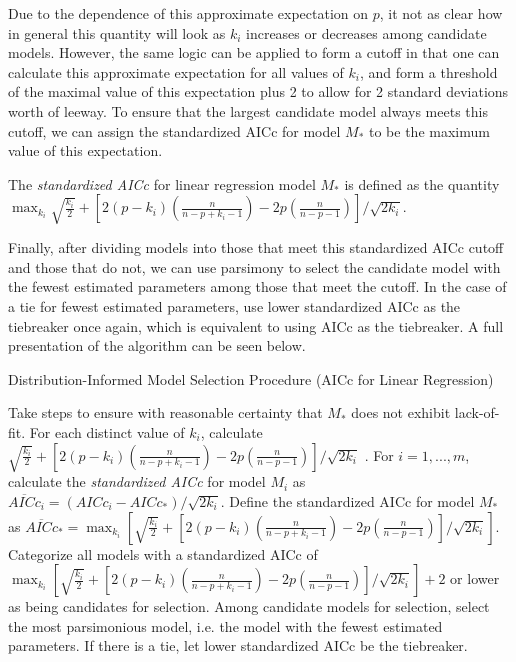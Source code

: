 		Due to the dependence of this approximate expectation on $p$, it not as clear how in general this quantity will look as $k_i$ increases
		or decreases among candidate models. However, the same logic can be applied to form a cutoff in that one can calculate this approximate
		expectation for all values of $k_i$, and form a threshold of the maximal value of this expectation plus 2 to allow for 2 standard deviations
		worth of leeway. To ensure that the largest candidate model always meets this cutoff, we can assign the standardized AICc for model $M_*$
		to be the maximum value of this expectation.
		\begin{definition}
			The \textit{standardized AICc} for linear regression model $M_*$ is defined as the quantity
			$\max_{k_i} \sqrt{\frac{k_i}{2}} + \left[ 2(p-k_i) \left( \frac{n}{n-p+k_i-1} \right) - 2p \left( \frac{n}{n-p-1} \right) \right] / \sqrt{2k_i}$.
		\end{definition}

		Finally, after dividing models into those that meet this standardized AICc cutoff and those that do not, we can use parsimony to select
		the candidate model with the fewest estimated parameters among those that meet the cutoff. In the case of a tie for fewest estimated parameters,
		use lower standardized AICc as the tiebreaker once again, which is equivalent to using AICc as the tiebreaker. A full presentation of
		the algorithm can be seen below.

		\begin{algorithm}[H]
			\caption{Distribution-Informed Model Selection Procedure (AICc for Linear Regression)}
			\begin{algorithmic}[1]
			  \State Take steps to ensure with reasonable certainty that $M_*$ does not exhibit lack-of-fit.
			  \State For each distinct value of $k_i$, calculate $\sqrt{\frac{k_i}{2}} + \left[ 2(p-k_i) \left( \frac{n}{n-p+k_i-1} \right) - 2p \left( \frac{n}{n-p-1} \right) \right] / \sqrt{2k_i}$ .
			  \State For $i = 1,...,m$, calculate the \textit{standardized AICc} for model $M_i$ as 
			  $\overline{AICc}_i = (AICc_i - AICc_*) / \sqrt{2k_i}$. Define the standardized AICc for model
			  $M_*$ as $\overline{AICc}_* = \max_{k_i} \left[ \sqrt{\frac{k_i}{2}} + \left[ 2(p-k_i) \left( \frac{n}{n-p+k_i-1} \right) - 2p \left( \frac{n}{n-p-1} \right) \right] / \sqrt{2k_i} \right]$.
			  \State Categorize all models with a standardized AICc of
			  $ \max_{k_i} \left[ \sqrt{\frac{k_i}{2}} + \left[ 2(p-k_i) \left( \frac{n}{n-p+k_i-1} \right) - 2p \left( \frac{n}{n-p-1} \right) \right] / \sqrt{2k_i} \right] + 2$
			  or lower as being candidates for selection.
			  \State Among candidate models for selection, select the most parsimonious model, i.e. the model
			  with the fewest estimated parameters. If there is a tie, let lower standardized AICc be the
			  tiebreaker.
			\end{algorithmic}
		\end{algorithm}

